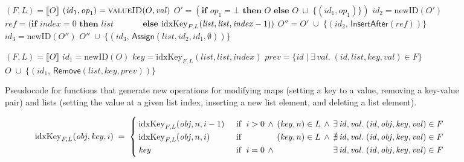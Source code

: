 \begin{figure}
\begin{minipage}[t]{0.5\textwidth}
\begin{algorithmic}
    \State $(F,L) = \llbracket O \rrbracket$
    \State $(\mathit{id}_1, \mathit{op}_1) = \Call{valueID}{O, \mathit{val}}$
    \State $O' = (\textbf{if } \mathit{op}_1 = \bot \textbf{ then } O \textbf{ else } 
        O \;\cup\; \big\{ (\mathit{id}_1, \mathit{op}_1) \big\})$
    \State $\mathit{id}_2 = \mathrm{newID}(O')$
    \State $\mathit{ref} = (\textbf{if } \mathit{index}=0 \textbf{ then } \mathit{list}$
    \State $\hphantom{\mathit{ref} = (}\textbf{else } \mathrm{idxKey}_{F,L}(\mathit{list}, \mathit{list}, \mathit{index} - 1))$
    \State $O'' = O' \;\cup\; \big\{ (\mathit{id}_2,\, \mathsf{InsertAfter}(\mathit{ref})) \big\}$
    \State $\mathit{id}_3 = \mathrm{newID}(O'')$
    \State \Return $O'' \;\cup\; \big\{ (\mathit{id}_3,\, \mathsf{Assign}(\mathit{list}, \mathit{id}_2, \mathit{id}_1, \emptyset)) \big\}$
    \EndFunction\Statex

    \State $(F,L) = \llbracket O \rrbracket$
    \State $\mathit{id}_1 = \mathrm{newID}(O)$
    \State $\mathit{key} = \mathrm{idxKey}_{F,L}(\mathit{list}, \mathit{list}, \mathit{index})$
    \State $\mathit{prev} = \{ \mathit{id} \mid \exists\,\mathit{val}.\; (\mathit{id}, \mathit{list}, \mathit{key}, \mathit{val}) \in F \}$
    \State \Return $O \;\cup\; \big\{ (\mathit{id}_1,\, \mathsf{Remove}(\mathit{list}, \mathit{key}, \mathit{prev})) \big\}$
    \EndFunction
\end{algorithmic}
\end{minipage}
\caption{Pseudocode for functions that generate new operations for modifying maps (setting a key to a value,
removing a key-value pair) and lists (setting the value at a given list index, inserting a new list element,
and deleting a list element).}\label{fig:pseudocode}
\end{figure}

\[ \mathrm{idxKey}_{F,L}(\mathit{obj}, \mathit{key}, i) \;=\; \left\{
   \arraycolsep=2pt \def\arraystretch{1.3}
   \begin{array}{llllll}
       \mathrm{idxKey}_{F,L}(\mathit{obj}, n, i-1) &
       \quad\text{if }\; i > 0 & \wedge & (\mathit{key}, n) \in L & \wedge &
       \exists\,\mathit{id}, \mathit{val}.\; (\mathit{id}, \mathit{obj}, \mathit{key}, \mathit{val}) \in F \\
       \mathrm{idxKey}_{F,L}(\mathit{obj}, n, i) &
       \quad\text{if }\; && (\mathit{key}, n) \in L & \wedge &
       \nexists\,\mathit{id}, \mathit{val}.\; (\mathit{id}, \mathit{obj}, \mathit{key}, \mathit{val}) \in F \\
       \mathit{key} &
       \quad\text{if }\; i = 0 & \wedge &&&
       \exists\,\mathit{id}, \mathit{val}.\; (\mathit{id}, \mathit{obj}, \mathit{key}, \mathit{val}) \in F \\
   \end{array} \right. \]

